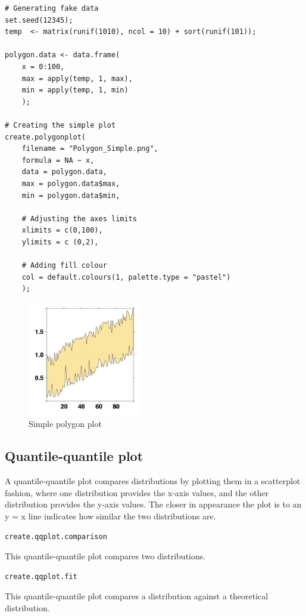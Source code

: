 \documentclass[letterpaper]{article}
\begin{document}
\begin{verbatim}
# Generating fake data
set.seed(12345);
temp  <- matrix(runif(1010), ncol = 10) + sort(runif(101));

polygon.data <- data.frame(
    x = 0:100,
    max = apply(temp, 1, max),
    min = apply(temp, 1, min)
    );

# Creating the simple plot
create.polygonplot(
    filename = "Polygon_Simple.png",
    formula = NA ~ x,
    data = polygon.data,
    max = polygon.data$max,
    min = polygon.data$min,

    # Adjusting the axes limits
    xlimits = c(0,100),
    ylimits = c (0,2),
    
    # Adding fill colour
    col = default.colours(1, palette.type = "pastel")
    );
\end{verbatim}

\begin{figure}[!ht]
  \begin{center}
     \includegraphics[width=50mm]{Figures/Polygon_Simple.png}
     \caption{Simple polygon plot}
  \end{center}
\end{figure}

\subsection{Quantile-quantile plot}
A quantile-quantile plot compares distributions by plotting them in a scatterplot fashion, where one distribution provides the x-axis values, and the other distribution provides the y-axis values. The closer in appearance the plot is to an y = x line indicates how similar the two distributions are.

\begin{verbatim}
create.qqplot.comparison
\end{verbatim}
This quantile-quantile plot compares two distributions.
\begin{verbatim}
create.qqplot.fit
\end{verbatim}
This quantile-quantile plot compares a distribution against a theoretical distribution.
\end{document}

